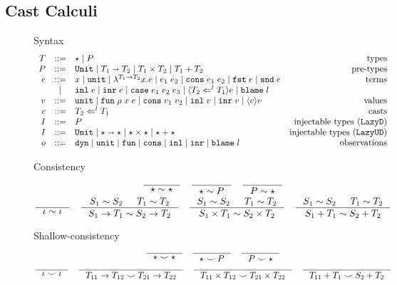 \documentclass[acmsmall,review,anonymous]{acmart}\settopmatter{printfolios=true,printccs=false,printacmref=false}
\newcommand{\stxrule}[3]{#1 & ::= & #3 & \text{#2}\\}
\newcommand{\stxrulecont}[1]{& | & #1 & \\}
\newcommand{\plus}[0]{+}
\newcommand{\lazyUD}{$\mathtt{Lazy UD}$}
\newcommand{\lazyD}{$\mathtt{Lazy D}$}
\newcommand{\POOunit}[0]{\mathtt{Unit}}
\newcommand{\POOfun}[2]{#1 \shortrightarrow #2}
\newcommand{\POOprod}[2]{#1 \times #2}
\newcommand{\POOsum}[2]{#1 \plus #2}
\newcommand{\eOOvar}[1]{#1}
\newcommand{\eOOsole}[0]{\mathtt{unit}}
\newcommand{\eOOlam}[4]{\lambda^{#1\rightarrow{}#2}#3.#4}
\newcommand{\eOOapp}[2]{#1 \; #2}
\newcommand{\eOOcons}[2]{\mathtt{cons} \; #1 \; #2}
\newcommand{\eOOcar}[1]{\mathtt{fst} \; #1}
\newcommand{\eOOcdr}[1]{\mathtt{snd} \; #1}
\newcommand{\eOOinl}[1]{\mathtt{inl} \; #1}
\newcommand{\eOOinr}[1]{\mathtt{inr} \; #1}
\newcommand{\eOOcase}[3]{\mathtt{case} \; #1 \; #2 \; #3}
\newcommand{\eOOcast}[4]{\langle \cOOcast{#2}{#3}{#4} \rangle #1}
\newcommand{\eOOblame}[1]{\mathtt{blame} \; #1}
\newcommand{\oOOinj}{\mathtt{dyn}}
\newcommand{\oOOsole}{\mathtt{unit}}
\newcommand{\oOOfun}{\mathtt{fun}}
\newcommand{\oOOcons}{\mathtt{cons}}
\newcommand{\oOOinl}{\mathtt{inl}}
\newcommand{\oOOinr}{\mathtt{inr}}
\newcommand{\oOOblame}[1]{\mathtt{blame} \; #1}
\newcommand{\cOOcast}[3]{#3 \Leftarrow^{#2} #1}
\newcommand{\vOOcast}[2]{\langle#2\rangle#1}
\newcommand{\vOOfun}[3]{\mathtt{fun} \; #1 \; #2 \; #3}
\newcommand{\vOOtt}[0]{\mathtt{unit}}
\newcommand{\vOOcons}[2]{\mathtt{cons}\;#1\;#2}
\newcommand{\vOOinl}[1]{\mathtt{inl}\;#1}
\newcommand{\vOOinr}[1]{\mathtt{inr}\;#1}
\begin{document}
\subsection{Cast Calculi}
\label{sec:cast-calculi}
\begin{figure}
	Syntax
	\[
	\begin{array}{rclr}
	\stxrule{T}{types}{
		\star \mid{}
		P
	}
	\stxrule{P}{pre-types}{
		\POOunit \mid
		\POOfun{T_1}{T_2} \mid
		\POOprod{T_1}{T_2} \mid
		\POOsum{T_1}{T_2}
	}
	\stxrule{e}{terms}{
		\eOOvar{x} \mid{}
		\eOOsole{} \mid{}
		\eOOlam{T_1}{T_2}{x}{e} \mid
		\eOOapp{e_1}{e_2} \mid
		\eOOcons{e_1}{e_2} \mid
		\eOOcar{e} \mid
		\eOOcdr{e}
	}
	\stxrulecont{
		\eOOinl{e} \mid
		\eOOinr{e} \mid
		\eOOcase{e_1}{e_2}{e_3} \mid
		\eOOcast{e}{T_1}{l}{T_2} \mid
		\eOOblame{l}
	}
	\stxrule{v}{values}{
		\vOOtt{} \mid
		\vOOfun{\rho}{x}{e} \mid
		\vOOcons{v_1}{v_2} \mid
		\vOOinl{v} \mid
		\vOOinr{v} \mid		
		\vOOcast{v}{c}
	}
	\stxrule{c}{casts}{
		\cOOcast{T_1}{l}{T_2}
	}
	\stxrule{I}{injectable types (\lazyD)}{
		P
	}
	\stxrule{I}{injectable types (\lazyUD)}{
		\POOunit \mid
		\POOfun{\star}{\star} \mid
		\star \times \star \mid
		\star + \star
	}
	\stxrule{o}{observations}{
		\oOOinj \mid
		\oOOsole \mid
		\oOOfun \mid
		\oOOcons \mid
		\oOOinl \mid
		\oOOinr \mid
		\oOOblame{l}
	}
	\end{array}
	\]
	
	Consistency
	\begin{gather*}
	\inference{}{
		\star \sim \star
	} \quad
	\inference{}{
		\star \sim P
	} \quad
	\inference{}{
		P \sim \star
	} \\
	\inference{}{
		\iota \sim \iota
	} \quad
	\inference{
		S_1 \sim S_2 &
		T_1 \sim T_2
	}{
		S_1 \rightarrow T_1 \sim S_2 \rightarrow T_2
	} \quad
	\inference{
		S_1 \sim S_2 &
		T_1 \sim T_2
	}{
		S_1 \times T_1 \sim S_2 \times T_2
	} \quad
	\inference{
		S_1 \sim S_2 &
		T_1 \sim T_2
	}{
		S_1 \plus T_1 \sim S_2 \plus T_2
	}
	\end{gather*}
	
	Shallow-consistency
	\begin{gather*}
	\inference{}{
		\star \smile \star
	} \quad
	\inference{}{
		\star \smile P
	} \quad
	\inference{}{
		P \smile \star
	} \\
	\inference{}{
		\iota \smile \iota
	} \quad
	\inference{}{
		T_{11} \rightarrow T_{12} \smile T_{21} \rightarrow T_{22}
	} \quad
	\inference{}{
		T_{11} \times T_{12} \smile T_{21} \times T_{22}
	} \quad
	\inference{}{
	T_{11} \plus T_1 \smile S_2 \plus T_2
	}
	\end{gather*}
	

\end{figure}
\end{document}
